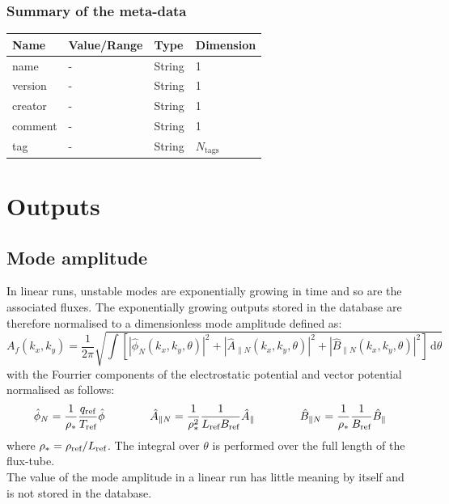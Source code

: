 \documentclass[fleqn]{report}
\begin{document}
\subsection{Summary of the meta-data}
\begin{tabularx}{\textwidth}{|X|Y|Y|Y|}
\hline
Name & Value/Range & Type & Dimension \\
\hline
name &  - & String & 1 \\
version &  - & String & 1 \\
creator &  - & String & 1 \\
comment &  - & String & 1 \\
tag  &  - & String & $N_\textrm{tags}$ \\
\hline
\end{tabularx}


\chapter{Outputs}
\section{Mode amplitude}
In linear runs, unstable modes are exponentially growing in time and so are the associated fluxes. 
The exponentially growing outputs stored in the database are therefore normalised to a dimensionless mode amplitude defined as:
\begin{equation}
 A_f(k_x,k_y) = \frac{1}{2\pi}\sqrt{\int \left[|\hat{\phi}_N(k_x,k_y,\theta)|^2 + |\hat{A}_{\parallel N}(k_x,k_y,\theta)|^2  + |\hat{B}_{\parallel N}(k_x,k_y,\theta)|^2\right] \,\textrm{d}\theta}
\end{equation}
with the Fourrier components of the electrostatic potential and vector potential normalised as follows:
\begin{equation}
  \hat{\phi}_N = \frac{1}{\rho_*}\frac{q_{\textrm{ref}}}{T_{\textrm{ref}}} \hat{\phi} \qquad \qquad 
  \hat{A}_{\parallel N}=\frac{1}{\rho_*^2}\frac{1}{L_{\textrm{ref}} B_{\textrm{ref}}} \hat{A}_\parallel \qquad \qquad
  \hat{B}_{\parallel N}=\frac{1}{\rho_*}\frac{1}{B_{\textrm{ref}}} \hat{B}_\parallel
\end{equation}
where $\rho_*=\rho_{\textrm{ref}}/L_{\textrm{ref}}$. The integral over $\theta$ is performed over the full length of the flux-tube.\\
The value of the mode amplitude in a linear run has little meaning by itself and is not stored in the database. 
\end{document}
